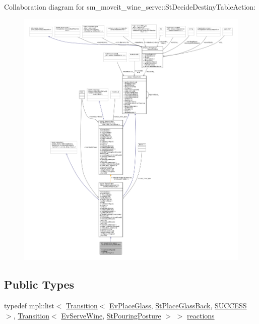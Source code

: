 Collaboration diagram for sm\+\_\+moveit\+\_\+wine\+\_\+serve\+:\+:St\+Decide\+Destiny\+Table\+Action\+:
\nopagebreak
\begin{figure}[H]
\begin{center}
\leavevmode
\includegraphics[width=350pt]{structsm__moveit__wine__serve_1_1StDecideDestinyTableAction__coll__graph}
\end{center}
\end{figure}
\subsection*{Public Types}
\begin{DoxyCompactItemize}
\item 
typedef mpl\+::list$<$ \hyperlink{classsmacc_1_1Transition}{Transition}$<$ \hyperlink{structsm__moveit__wine__serve_1_1EvPlaceGlass}{Ev\+Place\+Glass}, \hyperlink{structsm__moveit__wine__serve_1_1StPlaceGlassBack}{St\+Place\+Glass\+Back}, \hyperlink{structsmacc_1_1default__transition__tags_1_1SUCCESS}{S\+U\+C\+C\+E\+SS} $>$, \hyperlink{classsmacc_1_1Transition}{Transition}$<$ \hyperlink{structsm__moveit__wine__serve_1_1EvServeWine}{Ev\+Serve\+Wine}, \hyperlink{structsm__moveit__wine__serve_1_1StPouringPosture}{St\+Pouring\+Posture} $>$ $>$ \hyperlink{structsm__moveit__wine__serve_1_1StDecideDestinyTableAction_a1b9c9f81508614c86da1ee78225b2029}{reactions}
\end{DoxyCompactItemize}
